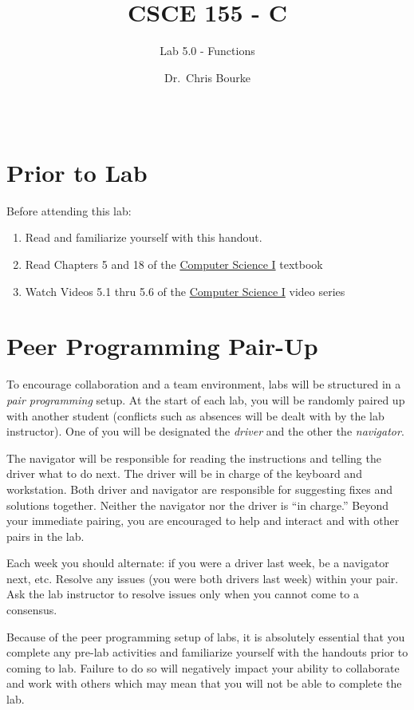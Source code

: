 \documentclass[12pt]{scrartcl}
\title{CSCE 155 - C}
\subtitle{Lab 5.0 - Functions}
\author{Dr.\ Chris Bourke}
\date{~}
\begin{document}
\maketitle

\section*{Prior to Lab}

Before attending this lab:
\begin{enumerate}
  \item Read and familiarize yourself with this handout.
  \item Read Chapters 5 and 18 of the \href{http://cse.unl.edu/~cbourke/ComputerScienceOne.pdf}{Computer Science I} textbook
  \item Watch Videos 5.1 thru 5.6 of the \href{https://www.youtube.com/playlist?list=PL4IH6CVPpTZVkiEnCEOdGbYsFEdtKc5Bx}{Computer Science I} video series
\end{enumerate}

\section*{Peer Programming Pair-Up}

To encourage collaboration and a team environment, labs will be
structured in a \emph{pair programming} setup.  At the start of
each lab, you will be randomly paired up with another student 
(conflicts such as absences will be dealt with by the lab instructor).
One of you will be designated the \emph{driver} and the other
the \emph{navigator}.  

The navigator will be responsible for reading the instructions and
telling the driver what to do next.  The driver will be in charge of the
keyboard and workstation.  Both driver and navigator are responsible
for suggesting fixes and solutions together.  Neither the navigator
nor the driver is ``in charge.''  Beyond your immediate pairing, you
are encouraged to help and interact and with other pairs in the lab.

Each week you should alternate: if you were a driver last week, 
be a navigator next, etc.  Resolve any issues (you were both drivers
last week) within your pair.  Ask the lab instructor to resolve issues
only when you cannot come to a consensus.  

Because of the peer programming setup of labs, it is absolutely 
essential that you complete any pre-lab activities and familiarize
yourself with the handouts prior to coming to lab.  Failure to do
so will negatively impact your ability to collaborate and work with 
others which may mean that you will not be able to complete the
lab.  
\end{document}
